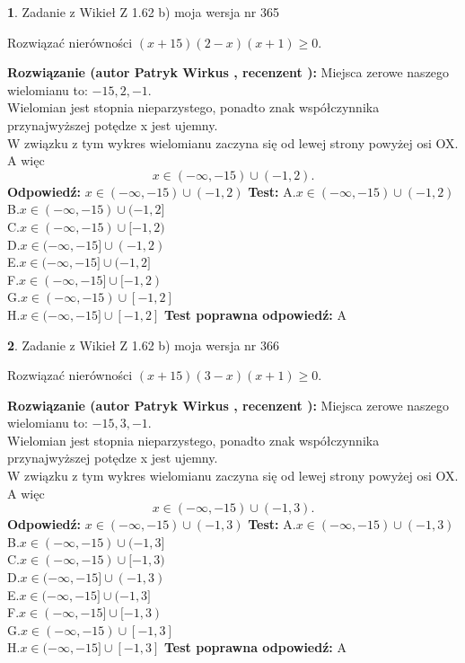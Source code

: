 \documentclass[12pt, a4paper]{article}
\theoremstyle{definition} %
\newtheorem{zad}{}
\newcommand{\zadStart}[1]{\begin{zad}#1\newline}
\newcommand{\zadStop}{\end{zad}}
\newcommand{\rozwStart}[2]{\noindent \textbf{Rozwiązanie (autor #1 , recenzent #2): }\newline}
\newcommand{\rozwStop}{\newline}
\newcommand{\odpStart}{\noindent \textbf{Odpowiedź:}\newline}
\newcommand{\odpStop}{\newline}
\newcommand{\testStart}{\noindent \textbf{Test:}\newline}
\newcommand{\testStop}{\newline}
\newcommand{\kluczStart}{\noindent \textbf{Test poprawna odpowiedź:}\newline}
\newcommand{\kluczStop}{\newline}
\begin{document}
\zadStart{Zadanie z Wikieł Z 1.62 b) moja wersja nr 365}

Rozwiązać nierówności $(x+15)(2-x)(x+1)\ge0$.
\zadStop
\rozwStart{Patryk Wirkus}{}
Miejsca zerowe naszego wielomianu to: $-15, 2, -1$.\\
Wielomian jest stopnia nieparzystego, ponadto znak współczynnika przy\linebreak najwyższej potędze x jest ujemny.\\ W związku z tym wykres wielomianu zaczyna się od lewej strony powyżej osi OX. A więc $$x \in (-\infty,-15) \cup (-1,2).$$
\rozwStop
\odpStart
$x \in (-\infty,-15) \cup (-1,2)$
\odpStop
\testStart
A.$x \in (-\infty,-15) \cup (-1,2)$\\
B.$x \in (-\infty,-15) \cup (-1,2]$\\
C.$x \in (-\infty,-15) \cup [-1,2)$\\
D.$x \in (-\infty,-15] \cup (-1,2)$\\
E.$x \in (-\infty,-15] \cup (-1,2]$\\
F.$x \in (-\infty,-15] \cup [-1,2)$\\
G.$x \in (-\infty,-15) \cup [-1,2]$\\
H.$x \in (-\infty,-15] \cup [-1,2]$
\testStop
\kluczStart
A
\kluczStop



\zadStart{Zadanie z Wikieł Z 1.62 b) moja wersja nr 366}

Rozwiązać nierówności $(x+15)(3-x)(x+1)\ge0$.
\zadStop
\rozwStart{Patryk Wirkus}{}
Miejsca zerowe naszego wielomianu to: $-15, 3, -1$.\\
Wielomian jest stopnia nieparzystego, ponadto znak współczynnika przy\linebreak najwyższej potędze x jest ujemny.\\ W związku z tym wykres wielomianu zaczyna się od lewej strony powyżej osi OX. A więc $$x \in (-\infty,-15) \cup (-1,3).$$
\rozwStop
\odpStart
$x \in (-\infty,-15) \cup (-1,3)$
\odpStop
\testStart
A.$x \in (-\infty,-15) \cup (-1,3)$\\
B.$x \in (-\infty,-15) \cup (-1,3]$\\
C.$x \in (-\infty,-15) \cup [-1,3)$\\
D.$x \in (-\infty,-15] \cup (-1,3)$\\
E.$x \in (-\infty,-15] \cup (-1,3]$\\
F.$x \in (-\infty,-15] \cup [-1,3)$\\
G.$x \in (-\infty,-15) \cup [-1,3]$\\
H.$x \in (-\infty,-15] \cup [-1,3]$
\testStop
\kluczStart
A
\kluczStop
\end{document}
